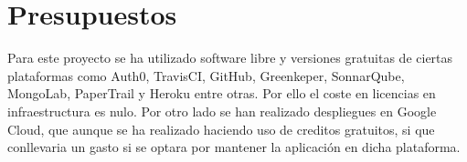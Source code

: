 \section {Presupuestos}

Para este proyecto se ha utilizado software libre y versiones gratuitas de ciertas plataformas como Auth0, TravisCI, GitHub, Greenkeper, SonnarQube, MongoLab, PaperTrail y Heroku entre otras. Por ello el coste en licencias en infraestructura es nulo. Por otro lado se han realizado despliegues en Google Cloud, que aunque se ha realizado haciendo uso de creditos gratuitos, si que conllevaria un gasto si se optara por mantener la aplicación en dicha plataforma.




